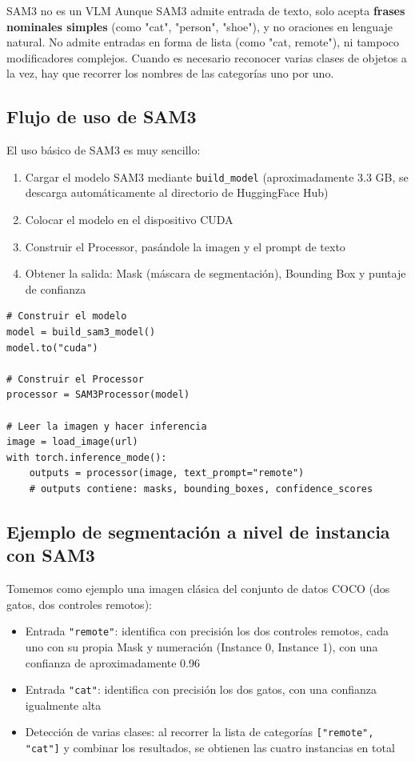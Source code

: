\documentclass[a4paper]{article}
\begin{document}
\begin{warningbox}{SAM3 no es un VLM}
Aunque SAM3 admite entrada de texto, solo acepta \textbf{frases nominales simples} (como "cat", "person", "shoe"), y no oraciones en lenguaje natural. No admite entradas en forma de lista (como "cat, remote"), ni tampoco modificadores complejos. Cuando es necesario reconocer varias clases de objetos a la vez, hay que recorrer los nombres de las categorías uno por uno.
\end{warningbox}

\subsection{Flujo de uso de SAM3}

El uso básico de SAM3 es muy sencillo:

\begin{enumerate}
    \item Cargar el modelo SAM3 mediante \texttt{build\_model} (aproximadamente 3.3 GB, se descarga automáticamente al directorio de HuggingFace Hub)
    \item Colocar el modelo en el dispositivo CUDA
    \item Construir el Processor, pasándole la imagen y el prompt de texto
    \item Obtener la salida: Mask (máscara de segmentación), Bounding Box y puntaje de confianza
\end{enumerate}

\begin{lstlisting}[caption={Ejemplo básico de uso de SAM3 (pseudocódigo)}]
# Construir el modelo
model = build_sam3_model()
model.to("cuda")

# Construir el Processor
processor = SAM3Processor(model)

# Leer la imagen y hacer inferencia
image = load_image(url)
with torch.inference_mode():
    outputs = processor(image, text_prompt="remote")
    # outputs contiene: masks, bounding_boxes, confidence_scores
\end{lstlisting}

\subsection{Ejemplo de segmentación a nivel de instancia con SAM3}

Tomemos como ejemplo una imagen clásica del conjunto de datos COCO (dos gatos, dos controles remotos):

\begin{itemize}
    \item Entrada \texttt{"remote"}: identifica con precisión los dos controles remotos, cada uno con su propia Mask y numeración (Instance 0, Instance 1), con una confianza de aproximadamente 0.96
    \item Entrada \texttt{"cat"}: identifica con precisión los dos gatos, con una confianza igualmente alta
    \item Detección de varias clases: al recorrer la lista de categorías \texttt{{[}"remote", "cat"{]}} y combinar los resultados, se obtienen las cuatro instancias en total
\end{itemize}
\end{document}
